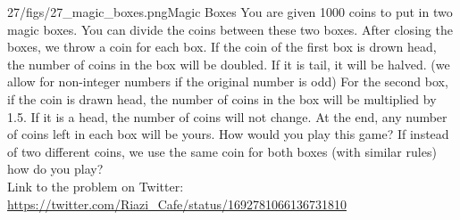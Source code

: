\begin{problem}{27/figs/27_magic_boxes.png}{Magic Boxes}
	You are given 1000 coins to put in two magic boxes. You can divide the coins between these two boxes. After closing the boxes, we throw a coin for each box.
If the coin of the first box is drown head, the number of coins in the box will be doubled. If it is tail, it will be halved. (we allow for non-integer numbers if the original number is odd)
For the second box, if the coin is drawn head, the number of coins in the box will be multiplied by 1.5. If it is a head, the number of coins will  not change.
At the end, any number of coins left in each box will be yours. How would  you play this game?
If instead of two different coins, we use the same coin for both boxes (with similar rules) how do you play?\\[0.2cm]

Link to the problem on Twitter:  \url{https://twitter.com/Riazi_Cafe/status/1692781066136731810}\end{problem}